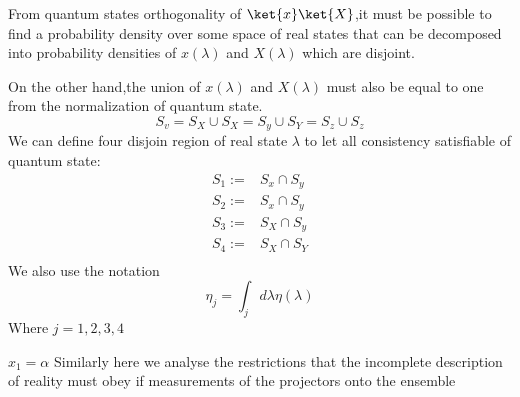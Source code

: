 From quantum states orthogonality of $\ket{x} \ket{X}$,it must be possible to find a probability density over some space of real states that can be decomposed into probability densities of $x(\lambda)$ and $X(\lambda)$ which are disjoint.


On the other hand,the union of $x(\lambda)$ and $X(\lambda)$ must also be equal to one from the normalization of quantum state.
\begin{equation}
S_v=S_X \cup S_X=S_y \cup S_Y=S_z \cup S_z
\end{equation}
We can define four disjoin region of real state $\lambda$ to let all consistency satisfiable of quantum state:
\begin{align*}
S_1:=&S_x\cap S_y\\
S_2:=&S_x\cap S_y\\
S_3:=&S_X\cap S_y\\
S_4:=&S_X\cap S_Y\\
\end{align*}
We also use the notation 
\begin{equation}
\eta_j=\int_j d\lambda \eta(\lambda)
\end{equation}
Where $j=1,2,3,4$

$x_1=\alpha$
Similarly  here  we  analyse the restrictions that the incomplete description of reality must obey if measurements of the projectors onto the ensemble 
